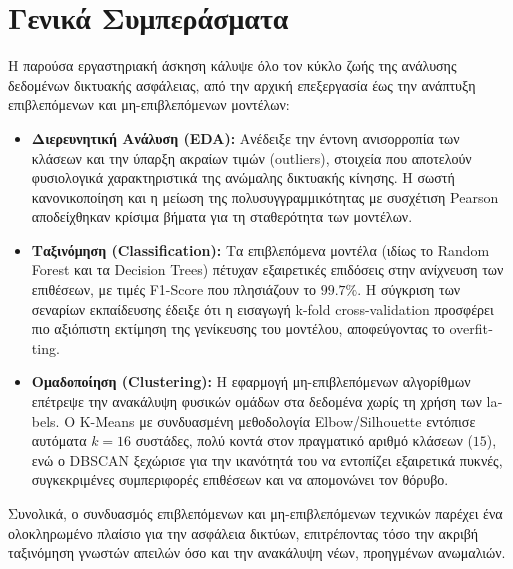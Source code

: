 \documentclass[11pt,a4paper]{article}
\newcommand{\eng}[1]{\textlatin{#1}}
\begin{document}
\section{Γενικά Συμπεράσματα}
Η παρούσα εργαστηριακή άσκηση κάλυψε όλο τον κύκλο ζωής της ανάλυσης δεδομένων δικτυακής ασφάλειας, από την αρχική επεξεργασία έως την ανάπτυξη επιβλεπόμενων και μη-επιβλεπόμενων μοντέλων:
\begin{itemize}
    \item \textbf{Διερευνητική Ανάλυση (\eng{EDA}):} Ανέδειξε την έντονη ανισορροπία των κλάσεων και την ύπαρξη ακραίων τιμών (\eng{outliers}), στοιχεία που αποτελούν φυσιολογικά χαρακτηριστικά της ανώμαλης δικτυακής κίνησης. Η σωστή κανονικοποίηση και η μείωση της πολυσυγγραμμικότητας με συσχέτιση \eng{Pearson} αποδείχθηκαν κρίσιμα βήματα για τη σταθερότητα των μοντέλων.
    \item \textbf{Ταξινόμηση (\eng{Classification}):} Τα επιβλεπόμενα μοντέλα (ιδίως το \eng{Random Forest} και τα \eng{Decision Trees}) πέτυχαν εξαιρετικές επιδόσεις στην ανίχνευση των επιθέσεων, με τιμές \eng{F1-Score} που πλησιάζουν το $99.7\%$. Η σύγκριση των σεναρίων εκπαίδευσης έδειξε ότι η εισαγωγή \eng{k-fold cross-validation} προσφέρει πιο αξιόπιστη εκτίμηση της γενίκευσης του μοντέλου, αποφεύγοντας το \eng{overfitting}.
    \item \textbf{Ομαδοποίηση (\eng{Clustering}):} Η εφαρμογή μη-επιβλεπόμενων αλγορίθμων επέτρεψε την ανακάλυψη φυσικών ομάδων στα δεδομένα χωρίς τη χρήση των \eng{labels}. Ο \eng{K-Means} με συνδυασμένη μεθοδολογία \eng{Elbow}/\eng{Silhouette} εντόπισε αυτόματα $k=16$ συστάδες, πολύ κοντά στον πραγματικό αριθμό κλάσεων ($15$), ενώ ο \eng{DBSCAN} ξεχώρισε για την ικανότητά του να εντοπίζει εξαιρετικά πυκνές, συγκεκριμένες συμπεριφορές επιθέσεων και να απομονώνει τον θόρυβο.
\end{itemize}
Συνολικά, ο συνδυασμός επιβλεπόμενων και μη-επιβλεπόμενων τεχνικών παρέχει ένα ολοκληρωμένο πλαίσιο για την ασφάλεια δικτύων, επιτρέποντας τόσο την ακριβή ταξινόμηση γνωστών απειλών όσο και την ανακάλυψη νέων, προηγμένων ανωμαλιών.
\end{document}
